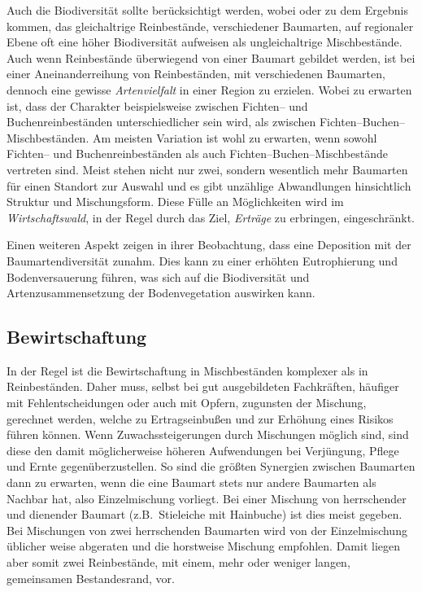 \documentclass[twocolumn]{scrartcl}
\begin{document}
Auch die Biodiversität sollte berücksichtigt werden, wobei
\cite{heinrichs2019Reinbestand} oder \cite{schall2017Reinbestand} zu
dem Ergebnis kommen, das gleichaltrige Reinbestände, verschiedener
Baumarten, auf regionaler Ebene oft eine höher Biodiversität aufweisen
als ungleichaltrige Mischbestände. Auch wenn Reinbestände überwiegend
von einer Baumart gebildet werden, ist bei einer Aneinanderreihung von
Reinbeständen, mit verschiedenen Baumarten, dennoch eine gewisse
\emph{Artenvielfalt} in einer Region zu erzielen. Wobei zu erwarten
ist, dass der Charakter beispielsweise zwischen Fichten-- und
Buchenreinbeständen unterschiedlicher sein wird, als zwischen
Fichten--Buchen--Mischbeständen. Am meisten Variation ist wohl zu
erwarten, wenn sowohl Fichten-- und Buchenreinbeständen als auch
Fichten--Buchen--Mischbestände vertreten sind. Meist stehen nicht nur
zwei, sondern wesentlich mehr Baumarten für einen Standort zur Auswahl
und es gibt unzählige Abwandlungen hinsichtlich Struktur und
Mischungsform. Diese Fülle an Möglichkeiten wird im
\emph{Wirtschaftswald}, in der Regel durch das Ziel, \emph{Erträge} zu
erbringen, eingeschränkt.

Einen weiteren Aspekt zeigen \cite{zhang2022MischwaldDeposition} in
ihrer Beobachtung, dass eine Deposition mit der Baumartendiversität
zunahm. Dies kann zu einer erhöhten Eutrophierung und Bodenversauerung
führen, was sich auf die Biodiversität und Artenzusammensetzung der
Bodenvegetation auswirken kann.

\subsection{Bewirtschaftung}
\label{ssec:bewirtschaftung}

In der Regel ist die Bewirtschaftung in Mischbeständen komplexer als
in Reinbeständen.  Daher muss, selbst bei gut ausgebildeten
Fachkräften, häufiger mit Fehlentscheidungen oder auch mit Opfern,
zugunsten der Mischung, gerechnet werden, welche zu Ertragseinbußen und
zur Erhöhung eines Risikos führen können. Wenn Zuwachssteigerungen
durch Mischungen möglich sind, sind diese den damit möglicherweise
höheren Aufwendungen bei Verjüngung, Pflege und Ernte
gegenüberzustellen. So sind die größten Synergien zwischen Baumarten
dann zu erwarten, wenn die eine Baumart stets nur andere Baumarten als
Nachbar hat, also Einzelmischung vorliegt. Bei einer Mischung von
herrschender und dienender Baumart (z.B.\ Stieleiche mit Hainbuche)
ist dies meist gegeben. Bei Mischungen von zwei herrschenden Baumarten
wird von der Einzelmischung üblicher weise abgeraten und die
horstweise Mischung empfohlen. Damit liegen aber somit zwei
Reinbestände, mit einem, mehr oder weniger langen, gemeinsamen
Bestandesrand, vor.
\end{document}
